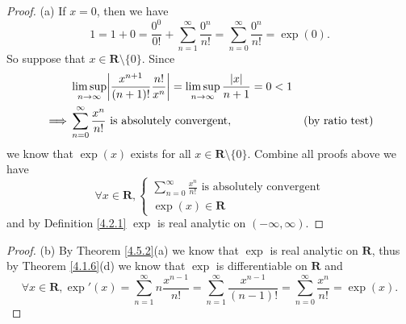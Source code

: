 \begin{proof}{(a)}
    If \(x = 0\), then we have
    \[
        1 = 1 + 0 = \frac{0^0}{0!} + \sum_{n = 1}^\infty \frac{0^n}{n!} = \sum_{n = 0}^\infty \frac{0^n}{n!} = \exp(0).
    \]
    So suppose that \(x \in \mathbf{R} \setminus \{0\}\).
    Since
    \begin{align*}
                 & \limsup_{n \to \infty} \abs*{\frac{x^{n + 1}}{(n + 1)!} \frac{n!}{x^n}} = \limsup_{n \to \infty} \frac{\abs*{x}}{n + 1} = 0 < 1                          \\
        \implies & \sum_{n = 0}^\infty \frac{x^n}{n!} \text{ is absolutely convergent},                                                            & \text{(by ratio test)}
    \end{align*}
    we know that \(\exp(x)\) exists for all \(x \in \mathbf{R} \setminus \{0\}\).
    Combine all proofs above we have
    \[
        \forall x \in \mathbf{R}, \begin{cases}
            \sum_{n = 0}^\infty \frac{x^n}{n!} \text{ is absolutely convergent} \\
            \exp(x) \in \mathbf{R}
        \end{cases}
    \]
    and by Definition \ref{4.2.1} \(\exp\) is real analytic on \((-\infty, \infty)\).
\end{proof}

\begin{proof}{(b)}
    By Theorem \ref{4.5.2}(a) we know that \(\exp\) is real analytic on \(\mathbf{R}\), thus by Theorem \ref{4.1.6}(d) we know that \(\exp\) is differentiable on \(\mathbf{R}\) and
    \[
        \forall x \in \mathbf{R}, \exp'(x) = \sum_{n = 1}^\infty n \frac{x^{n - 1}}{n!} = \sum_{n = 1}^\infty \frac{x^{n - 1}}{(n - 1)!} = \sum_{n = 0}^\infty \frac{x^n}{n!} = \exp(x).
    \]
\end{proof}

